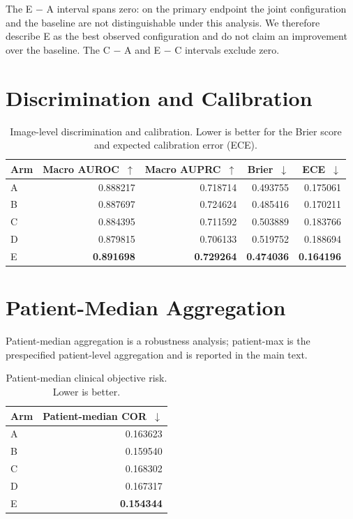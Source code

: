 \documentclass[journal]{IEEEtran}
\begin{document}
The E $-$ A interval spans zero: on the primary endpoint the
joint configuration and the baseline are not distinguishable under this
analysis. We therefore describe E as the best observed configuration and do not
claim an improvement over the baseline. The C $-$ A and E $-$ C intervals
exclude zero.

\section{Discrimination and Calibration}

\begin{table}[!t]
\centering
\caption{Image-level discrimination and calibration. Lower is better for the
Brier score and expected calibration error (ECE).}
\label{tab:auc}
\footnotesize
\setlength{\tabcolsep}{4pt}
\begin{tabular}{@{}l rrrr@{}}
\toprule
Arm & Macro AUROC~$\uparrow$ & Macro AUPRC~$\uparrow$ & Brier~$\downarrow$ & ECE~$\downarrow$ \\
\midrule
A & 0.888217 & 0.718714 & 0.493755 & 0.175061 \\
B & 0.887697 & 0.724624 & 0.485416 & 0.170211 \\
C & 0.884395 & 0.711592 & 0.503889 & 0.183766 \\
D & 0.879815 & 0.706133 & 0.519752 & 0.188694 \\
E & \textbf{0.891698} & \textbf{0.729264} & \textbf{0.474036} & \textbf{0.164196} \\
\bottomrule
\end{tabular}
\end{table}

\section{Patient-Median Aggregation}

Patient-median aggregation is a robustness analysis; patient-max is the
prespecified patient-level aggregation and is reported in the main text.

\begin{table}[!t]
\centering
\caption{Patient-median clinical objective risk. Lower is better.}
\label{tab:pmed}
\small
\begin{tabular}{@{}l r@{}}
\toprule
Arm & Patient-median COR~$\downarrow$ \\
\midrule
A & 0.163623 \\
B & 0.159540 \\
C & 0.168302 \\
D & 0.167317 \\
E & \textbf{0.154344} \\
\bottomrule
\end{tabular}
\end{table}
\end{document}
